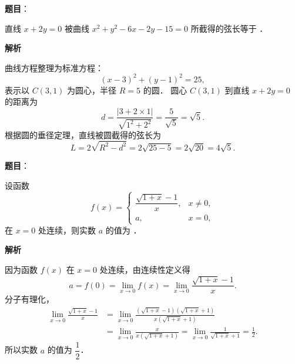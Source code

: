 \begin{answer}

\textbf{题目}：

直线 $x + 2y = 0$ 被曲线 $x^2 + y^2 - 6x - 2y - 15 = 0$ 所截得的弦长等于 \underline{\hspace{3cm}}．

\textbf{解析}

曲线方程整理为标准方程：
\nopagebreak[4]
\[
(x - 3)^2 + (y - 1)^2 = 25,
\]
表示以 $C(3, 1)$ 为圆心，半径 $R = 5$ 的圆．
圆心 $C(3, 1)$ 到直线 $x + 2y = 0$ 的距离为
\nopagebreak[4]
\[
d = \frac{|3 + 2 \times 1|}{\sqrt{1^2 + 2^2}} = \frac{5}{\sqrt{5}} = \sqrt{5}.
\]
根据圆的垂径定理，直线被圆截得的弦长为
\nopagebreak[4]
\[
L = 2\sqrt{R^2 - d^2} = 2\sqrt{25 - 5} = 2\sqrt{20} = 4\sqrt{5}.
\]


\end{answer}
\begin{answer}

\textbf{题目}：

设函数
\nopagebreak[4]
\[
f(x) = \begin{cases} \dfrac{\sqrt{1+x}-1}{x}, & x \neq 0, \\ a, & x = 0, \end{cases}
\]
在 $x = 0$ 处连续，则实数 $a$ 的值为 \underline{\hspace{3cm}}．

\textbf{解析}

因为函数 $f(x)$ 在 $x = 0$ 处连续，由连续性定义得
\nopagebreak[4]
\[
a = f(0) = \lim_{x \to 0} f(x) = \lim_{x \to 0} \frac{\sqrt{1+x} - 1}{x}.
\]
分子有理化，
\nopagebreak[4]
\[
\begin{aligned}
\lim_{x \to 0} \frac{\sqrt{1+x} - 1}{x} &= \lim_{x \to 0} \frac{(\sqrt{1+x} - 1)(\sqrt{1+x} + 1)}{x(\sqrt{1+x} + 1)} \\
&= \lim_{x \to 0} \frac{x}{x(\sqrt{1+x} + 1)} = \lim_{x \to 0} \frac{1}{\sqrt{1+x} + 1} = \frac{1}{2}.
\end{aligned}
\]
所以实数 $a$ 的值为 $\dfrac{1}{2}$．


\end{answer}
